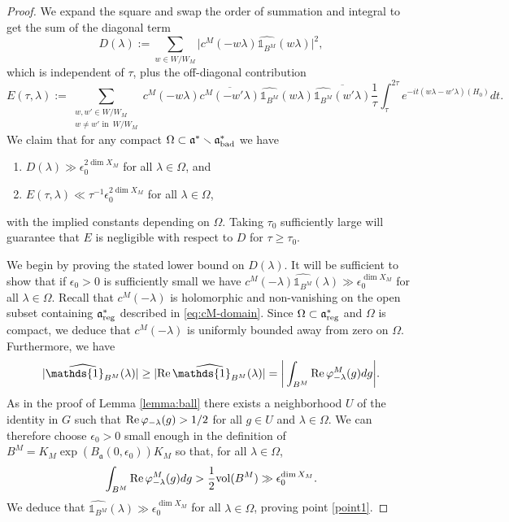 \documentclass[12pt]{amsart}
\theoremstyle{remark}
\newcommand{\ga}{\mathfrak a}
\begin{document}
\begin{proof}
We expand the square and swap the order of summation and integral to get the sum of the diagonal term
\[
D(\lambda):= \sum_{w \in W / W_M}  \Big|c^M(-w\lambda)\widehat{\mathds{1}_{B^M}}(w\lambda) \Big|^2, 
\]
which is independent of $\tau$, plus the off-diagonal contribution
\[
E(\tau,\lambda):=\sum_{\substack{w, w' \in W / W_M\\ w\neq w' \textrm{ in }\, W / W_M}} c^M(-w\lambda) \overline{c^M(-w'\lambda)}\widehat{\mathds{1}_{B^M}}(w\lambda)\overline{\widehat{\mathds{1}_{B^M}}(w'\lambda)}  \frac{1}{\tau} \int_{\tau}^{2\tau} e^{-it(w \lambda-w'\lambda) (H_0)}  dt.
\]
We claim that for any compact $\Omega \subset \ga^* \smallsetminus \ga^*_{\textnormal{bad}}$ we have
\begin{enumerate}
\item\label{point1} $D(\lambda) \gg \epsilon_0^{2 \dim X_M}$ for all $\lambda\in\Omega$, and 
\item\label{point2} $E(\tau, \lambda)\ll \tau^{-1} \epsilon_0^{2 \dim X_M}$ for all $\lambda\in\Omega$,
\end{enumerate}
with the implied constants depending on $\Omega$. Taking $\tau_0$ sufficiently large will guarantee that $E$ is negligible with respect to $D$ for $\tau \geq \tau_0$.

We begin by proving the stated lower bound on $D(\lambda)$. It will be sufficient to show that if $\epsilon_0>0$ is sufficiently small we have $c^M(-\lambda)\widehat{\mathds{1}_{B^M}}(\lambda) \gg \epsilon_0^{\dim X_M}$ for all $\lambda \in \Omega$. Recall that $c^M(-\lambda)$ is holomorphic and non-vanishing on the open subset containing $\ga_{\rm reg}^*$ described in \eqref{eq:cM-domain}. Since $\Omega\subset \ga^*_{\rm reg}$ and $\Omega$ is compact, we deduce that $c^M(-\lambda)$ is uniformly bounded away from zero on $\Omega$. Furthermore, we have
\[
|\widehat{\mathds{1}_{B^M}}(\lambda)|\ge |{\rm Re} \,\widehat{\mathds{1}_{B^M}}(\lambda)|=\bigg|\int_{B^M}   {\rm Re}\,\varphi_{-\lambda}^M(g) dg \bigg|.
\]
As in the proof of Lemma \ref{lemma:ball} there exists a neighborhood $U$ of the identity in $G$ such that  ${\rm Re}\,\varphi_{-\lambda}(g)> 1/2$ for all $g\in U$ and $\lambda\in\Omega$. We can therefore choose $\epsilon_0>0$ small enough in the definition of $B^M=K_M\exp(B_\ga(0,\epsilon_0))K_M$ so that, for all $\lambda \in \Omega$,
\[
\int_{B^M} {\rm Re}\,\varphi_{-\lambda}^M(g) dg >\frac{1}{2} {\rm vol}(B^M) \gg \epsilon_0^{\dim X_M}.
\]
We deduce that $\widehat{\mathds{1}_{B^M}}(\lambda) \gg \epsilon_0^{\dim X_M}$ for all $\lambda\in\Omega$, proving point \eqref{point1}.


\end{proof}
\end{document}
